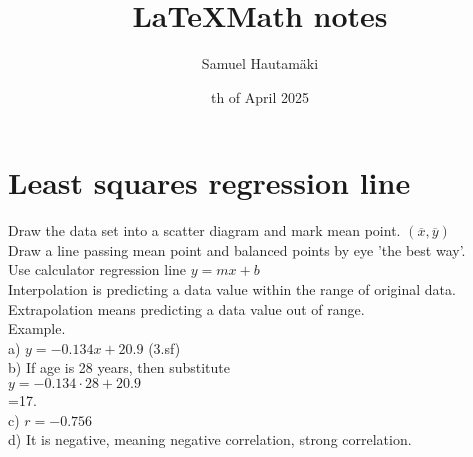\documentclass{article}
\title{\LaTeX Math notes}
\author{Samuel Hautamäki}
\date{th of April 2025}
\begin{document}
  \maketitle
   
  \section{Least squares regression line}
  Draw the data set into a scatter diagram and mark mean point. $(\overline{x}, \overline{y})$\\
  Draw a line passing mean point and balanced points by eye 'the best way'.\\
  Use calculator regression line $y=mx+b$\\
  Interpolation is predicting a data value within the range of original data.\\
  Extrapolation means predicting a data value out of range.\\ 
  Example.\\
  a) $y=-0.134x + 20.9$ (3.sf)\\
  b) If age is 28 years, then substitute\\
  $y=-0.134\cdot 28+20.9$\\
  =17.\\
  c) $r=-0.756$\\
  d) It is negative, meaning negative correlation, strong correlation.\\
  
\end{document}

